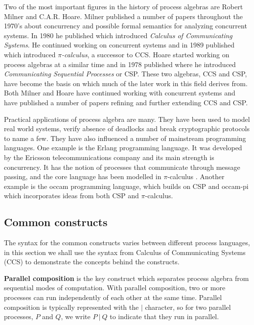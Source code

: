 	Two of the most important figures in the history of process algebras are 
	Robert Milner and C.A.R. Hoare. Milner published a number of papers 
	\cite{milner1,milner2,milner3} throughout the 1970's about concurrency and 
	possible formal semantics for 
	analyzing concurrent systems. In 1980 he published \cite{Milner80} which 
	introduced \textit{Calculus of Communicating Systems}. He continued working 
	on concurrent systems and in 1989 published \cite{Milner89acalculus} which 
	introduced $\pi$\textit{-calculus}, a successor to CCS. Hoare started 
	working on process algebras at a similar time and in 1978 published 
	\cite{csp} where he introduced \textit{Communicating Sequential Processes} 
	or CSP. These two algebras, CCS and CSP, have become the basis on which much 
	of the later work in this field derives from. Both Milner and Hoare have 
	continued working with concurrent systems and have published a number of 
	papers refining and further extending CCS and CSP.
	
	Practical applications of process algebra are many. They have been used to 
	model real world systems, verify absence of deadlocks and break 
	cryptographic protocols to name a few. They have also influenced a number of 
	mainstream programming languages. One example is the Erlang programming 
	language. It was developed by the Ericsson telecommunications company and 
	its main strength is concurrency. It has the notion of processes that 
	communicate through message passing, and the core language has been modelled 
	in $\pi$-calculus \cite{erlang}. Another example is the occam programming 
	language, which builds on CSP and occam-pi \cite{occampi} which incorporates 
	ideas from both CSP and $\pi$-calculus.
		
	
\subsection{Common constructs}\label{sec:common_constructs}
	
	The syntax for the common constructs varies between different process 
	languages, in this section we shall use the syntax from Calculus of 
	Communicating Systems (CCS) to demonstrate the concepts behind the 
	constructs.
	
	\textbf{Parallel composition} is the key construct which separates process 
	algebra from sequential modes of computation. With parallel composition, two 
	or more processes can run independently of each other at the same time. 
	Parallel composition is typically represented with the $|$ character, so for 
	two parallel processes, $P$ and $Q$, we write $P\ |\ Q$ to indicate that 
	they run in parallel.

